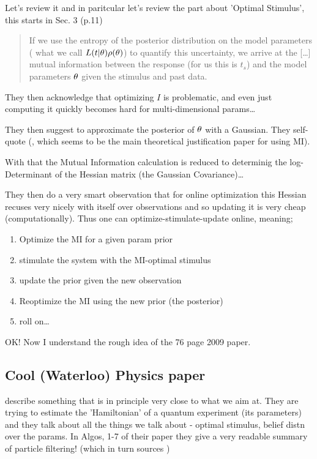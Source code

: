 \documentclass{article}
\begin{document}
Let's review it and in paritcular let's review the part about 'Optimal
Stimulus', this starts in Sec. 3 (p.11)

\begin{quote}
If we use the entropy of the posterior
distribution on the model parameters ( what we call $L(t|{\theta})
\rho({\theta})$) to quantify this uncertainty, we arrive at the [\ldots] 
mutual information between the response (for us this is $t_s$) and the model
parameters ${\theta}$ given the stimulus and past data.  
\end{quote}

They then acknowledge that optimizing $I$ is problematic, and even just
computing it quickly becomes hard for multi-dimensional params\ldots

They then suggest to approximate the posterior of ${\theta}$ with a Gaussian. They
self-quote (\cite{Paninski2005}, which seems to be the main theoretical
justification paper for using MI).

With that the Mutual Information calculation is reduced to determinig the
log-Determinant of the Hessian matrix (the Gaussian Covariance)\ldots

They then do a very smart observation that for online optimization this Hessian
recuses very nicely with itself over observations and so updating it is very
cheap (computationally). Thus one can optimize-stimulate-update online, meaning;

\begin{enumerate}
  \item Optimize the MI for a given param prior
  \item stimulate the system with the MI-optimal stimulus
  \item update the prior given the new observation
  \item Reoptimize the MI using the new prior (the posterior)
  \item roll on\ldots
\end{enumerate}

OK! Now I understand the rough idea of the 76 page 2009 paper\cite{Lewi2009}.

\subsection{Cool (Waterloo) Physics paper}
\cite{Granade2012} describe something that is in principle very close to what we
aim at. They are trying to estimate the 'Hamiltonian' of a quantum experiment
(its parameters) and they talk about all the things we talk about - optimal
stimulus, belief distn over the params. In Algos, 1-7 of their paper they give a
very readable summary of particle filtering! (which in turn sources
\cite{Liu2001})



\end{document}
